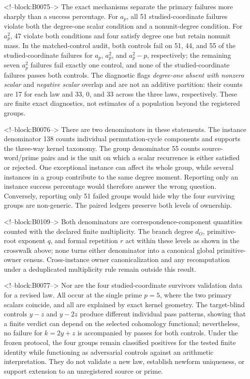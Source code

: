 \documentclass[11pt]{article}
\theoremstyle{definition}
\theoremstyle{remark}
\begin{document}
<!--block:B0075-->
The exact mechanisms separate the primary failures more sharply than a success percentage. For $a_p$, all 51 studied-coordinate failures violate both the degree-one scalar condition and a nonunit-degree condition. For $a_p^2$, 47 violate both conditions and four satisfy degree one but retain nonunit mass. In the matched-control audit, both controls fail on 51, 44, and 55 of the studied-coordinate failures for $a_p$, $a_p^2$, and $a_p^2-p$, respectively; the remaining seven $a_p^2$ failures fail exactly one control, and none of the studied-coordinate failures passes both controls. The diagnostic flags \emph{degree-one absent with nonzero scalar} and \emph{negative scalar} overlap and are not an additive partition: their counts are 17 for each law and 33, 0, and 33 across the three laws, respectively. These are finite exact diagnostics, not estimates of a population beyond the registered groups.

<!--block:B0076-->
There are two denominators in these statements. The instance denominator 138 counts individual permutation-cycle components and supports the three-way kernel taxonomy. The group denominator 55 counts source-word/prime pairs and is the unit on which a scalar recurrence is either satisfied or rejected. One exceptional instance can affect its whole group, while several instances in a group contribute to the same degree moment. Reporting only an instance success percentage would therefore answer the wrong question. Conversely, reporting only 51 failed groups would hide why the four surviving groups are non-generic. The paired ledgers preserve both levels of ownership.

<!--block:B0109-->
Both denominators are correspondence-component quantities counted with the declared finite multiplicity. The branch degree $d_O$, primitive-root exponent $q$, and formal repetition $r$ act within these levels as shown in the crosswalk above; none turns either denominator into a canonical global primitive-owner census. Cross-instance owner canonicalization and any recomputation under a deduplicated multiplicity rule remain outside this result.

<!--block:B0077-->
Nor are the four studied-coordinate survivors validation data for a revised law. All occur at the single prime $p=5$, where the two primary scalars coincide, and all are explained by exact kernel geometry. The target-blind controls $y-z$ and $y-2z$ produce different individual pass patterns, showing that a finite verdict can depend on the selected cohomology functional; nevertheless, no failure for $k=2y+z$ is accompanied by passes for both controls. Under the frozen protocol, the four groups remain classified positives for the tested finite identity while functioning as adversarial controls against an arithmetic interpretation. They do not validate a new law, establish newform uniqueness, or support extension to an unregistered source or prime.
\end{document}
